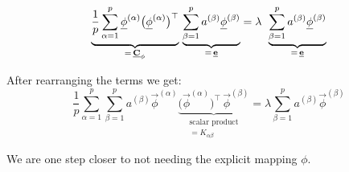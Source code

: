 \begin{frame}{\subsubsecname}



\begin{equation}
\underbrace{\frac{1}{p} \sum_{\alpha=1}^{p} \vec{\phi}^{(\alpha)} \big(\vec{\phi}^{(\alpha)}\big)^\top 
\vphantom{\sum^{p}_{\beta=1}}
}_{=\,\vec C_{\phi}}
 \, 
\underbrace{\sum^{p}_{\beta=1} a^{(\beta)} \vec{\phi}^{(\beta)}}_{=\,\vec e}
 = \lambda \;\,
\underbrace{\sum^{p}_{\beta=1} a^{(\beta)} \vec{\phi}^{(\beta)}}_{=\,\vec e}
\end{equation}

\pause

After rearranging the terms we get:
\begin{equation} \label{eq:eig2}
\frac{1}{p} \sum_{\alpha=1}^{p} \sum^{p}_{\beta=1} 
a^{(\beta)} \vec{\phi}^{(\alpha)}
\underbrace{
 \big(\vec{\phi}^{(\alpha)}\big)^\top  \,  \vec{\phi}^{(\beta)}
}_{\substack{\text{scalar product}\\ = K_{\alpha\beta}}}
 = \lambda 
\sum^{p}_{\beta=1} a^{(\beta)} \vec{\phi}^{(\beta)}
\end{equation}

We are one step closer to not needing the explicit mapping $\phi$.

\end{frame}

